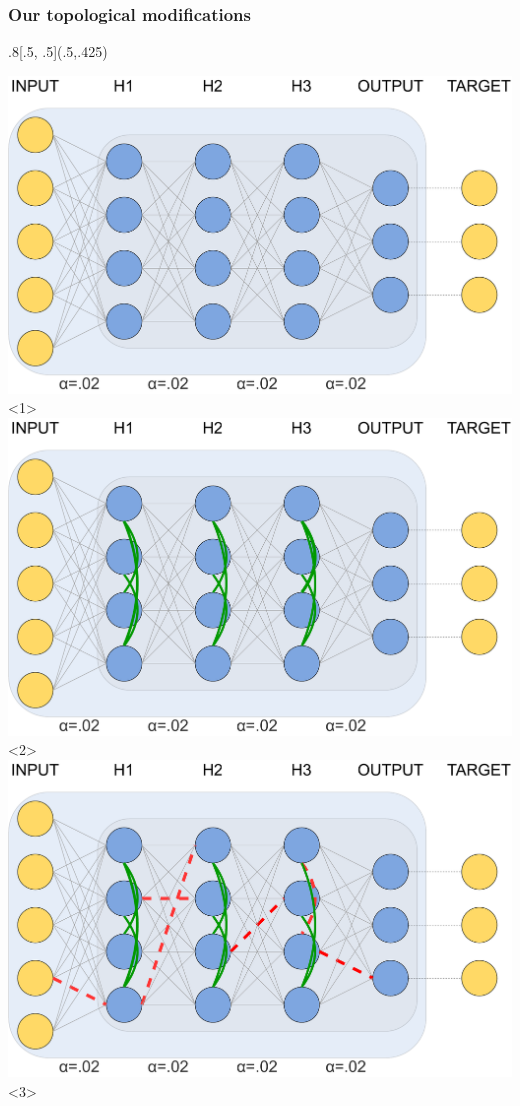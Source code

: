 \documentclass[pdf]{beamer}
\begin{document}
\begin{frame} 
	\frametitle{Our topological modifications}
	\begin{textblock*}{.8\textwidth}[.5, .5](.5\paperwidth,.425\paperheight)
		\begin{center}
		\includegraphics[width=\textwidth]{figures/topology_changes_step1.pdf}<1>
		\includegraphics[width=\textwidth]{figures/topology_changes_step2.pdf}<2>
		\includegraphics[width=\textwidth]{figures/topology_changes_step3.pdf}<3>

\end{center}
\end{textblock*}
\end{frame}
\end{document}
